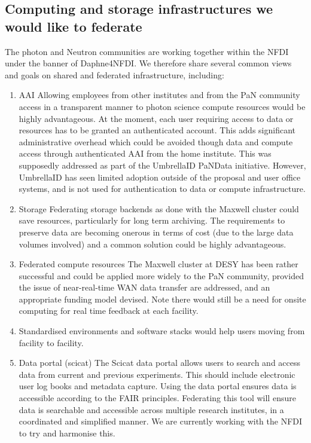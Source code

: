 \subsection{Computing and storage infrastructures we would like to
federate}

The photon and Neutron communities are working together within the NFDI
under the banner of Daphne4NFDI.  We therefore share several common
views and goals on shared and federated infrastructure, including: 

\begin{enumerate}
\item AAI Allowing employees from other institutes and from the PaN
community access in a transparent manner to photon science compute
resources would be highly advantageous.  At the moment, each user
requiring access to data or resources has to be granted an authenticated
account.  This adds significant administrative overhead which could be
avoided though data and compute access through authenticated AAI from
the home institute. This was supposedly addressed as part of the
UmbrellaID PaNData initiative. However, UmbrellaID has seen limited
adoption outside of the proposal and user office systems, and is not
used for authentication to data or compute infrastructure.  

\item Storage Federating storage backends as done with the Maxwell
cluster could save resources, particularly for long term archiving.  The
requirements to preserve data are becoming onerous in terms of cost (due
to the large data volumes involved) and a common solution could be
highly advantageous. 

\item Federated compute resources The Maxwell cluster at DESY has been
rather successful and could be applied more widely to the PaN community,
provided the issue of near-real-time WAN data transfer are addressed,
and an appropriate funding model devised.   Note there would still be a
need for onsite computing for real time feedback at each facility. 

\item Standardised environments and software stacks would help users
moving from facility to facility. 

\item Data portal (scicat) The Scicat data portal allows users to search
and access data from current and previous experiments. This should
include electronic user log books and metadata capture.  Using the data
portal ensures data is accessible according to the FAIR principles.
Federating this tool will ensure data is searchable and accessible
across multiple research institutes, in a coordinated and simplified
manner.  We are currently working with the NFDI to try and harmonise
this.
\end{enumerate}
